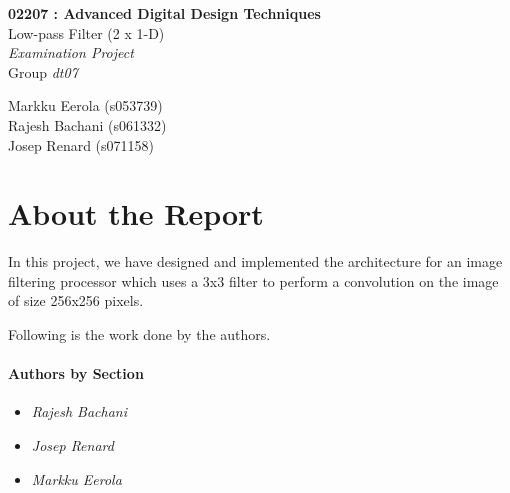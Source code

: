 \documentclass[11pt,a4paper]{article}
\begin{document}
	

\begin{titlepage}

\thispagestyle{fancy}
\lhead{}
\rhead{}
\rule{0pt}{50pt}
\vspace{3cm}

\begin{center}
 	\huge{\textbf{02207 : Advanced Digital Design Techniques}}\\
 	\vspace{1cm}
 	\huge{Low-pass Filter (2 x 1-D)}\\
 	\vspace{1cm}
 	\huge{\textit{Examination Project}}\\
 	\vspace{1cm}
 	\huge{Group \textit{dt07}}\\
\end{center}

\vspace{4cm}

\begin{flushright}
	\LARGE{Markku Eerola (s053739)}\\
	\vspace{0.3cm}
	\LARGE{Rajesh Bachani (s061332)}\\
	\vspace{0.3cm}
	\LARGE{Josep Renard (s071158)}\\
\end{flushright}
\cfoot{\today}
\end{titlepage}

\newpage 
\tableofcontents

\newpage

\section{About the Report}
In this project, we have designed and implemented the architecture for an image filtering processor which uses a 3x3 filter to perform a convolution on the image of size 256x256 pixels.

Following is the work done by the authors.
\paragraph{Authors by Section}
\begin{itemize}
\item \textit{Rajesh Bachani} 
\item \textit{Josep Renard} 
\item \textit{Markku Eerola} 
\end{itemize}
\end{document}
